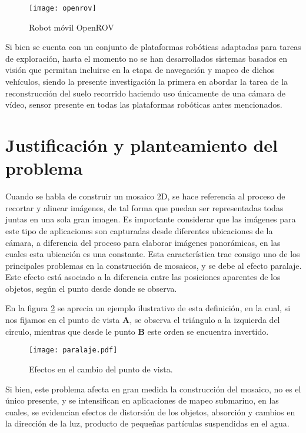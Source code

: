 \begin{figure}[H]
	\centering
	\texttt{[image: openrov]}
	\caption{Robot móvil OpenROV}
	\label{imagen:openrov}
\end{figure}
Si bien se cuenta con un conjunto de plataformas robóticas adaptadas para tareas de exploración, hasta el momento no se han desarrollados sistemas basados en visión que permitan incluirse en la etapa de navegación y mapeo de dichos vehículos, siendo la presente investigación la primera en abordar la tarea de la reconstrucción del suelo recorrido haciendo uso únicamente de una cámara de vídeo, sensor presente en todas las plataformas robóticas antes mencionados.

\section{Justificación y planteamiento del problema}


Cuando se habla de construir un mosaico 2D, se hace referencia al proceso de recortar y alinear imágenes, de tal forma que puedan ser representadas todas juntas en una sola gran imagen. Es importante considerar que las imágenes para este tipo de aplicaciones son capturadas desde diferentes ubicaciones de la cámara, a diferencia del proceso para elaborar imágenes panorámicas, en las cuales esta ubicación es una constante. Esta característica trae consigo uno de los principales problemas en la construcción de mosaicos, y se debe al efecto paralaje. Este efecto está asociado a la diferencia entre las posiciones aparentes de los objetos, según el punto desde donde se observa.

En la figura \ref{imagen:paralaje} se aprecia un ejemplo ilustrativo de esta definición, en la cual, si nos fijamos en el punto de vista \textbf{A}, se observa el triángulo a la izquierda del circulo, mientras que desde le punto \textbf{B} este orden se encuentra invertido. 

\begin{figure}[H]
	\centering
	\texttt{[image: paralaje.pdf]}
	\caption[Efectos en el cambio del punto de vista]{Efectos en el cambio del punto de vista.}
	\label{imagen:paralaje}
\end{figure}

Si bien, este problema afecta en gran medida la construcción del mosaico, no es el único presente, y se intensifican en aplicaciones de mapeo submarino, en las cuales, se evidencian efectos de distorsión de los objetos, absorción y cambios en la dirección de la luz, producto de pequeñas partículas suspendidas en el agua.

